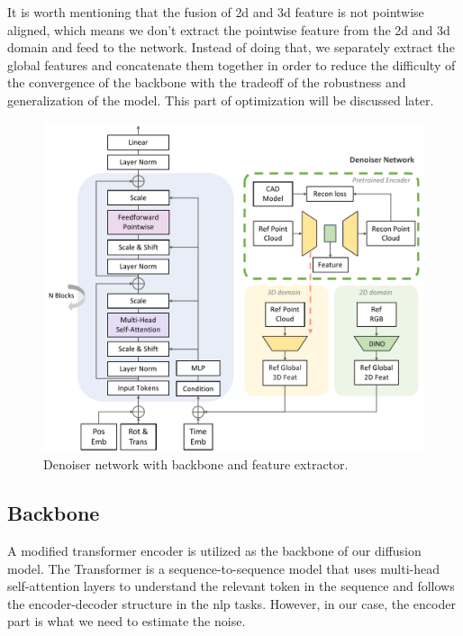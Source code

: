\documentclass[12pt,DIV14,BCOR12mm,a4paper,footinclude=false,headinclude,parskip=half-,twoside,openright,cleardoublepage=empty,toc=index,bibliography=totoc,listof=totoc]{scrreprt}
\numberwithin{equation}{chapter}
\begin{document}
It is worth mentioning that the fusion of \gls{2d} and \gls{3d} feature is not pointwise aligned, which means we don't extract the pointwise feature from the \gls{2d} and \gls{3d} domain and feed to the network. Instead of doing that, we separately extract the global features and concatenate them together in order to reduce the difficulty of the convergence of the backbone with the tradeoff of the robustness and generalization of the model. This part of optimization will be discussed later.
\begin{figure}[h]
	\centering
	\includegraphics[width=1.0\textwidth]{img/denoiser.pdf}
	\caption{Denoiser network with backbone and feature extractor.}
	\label{img:denoiser}
\end{figure}

\subsection{Backbone}
A modified transformer encoder is utilized as the backbone of our diffusion model. The Transformer \cite{vaswani2023attention} is a sequence-to-sequence model that uses multi-head self-attention layers to understand the relevant token in the sequence and follows the encoder-decoder structure in the \gls{nlp} tasks. However, in our case, the encoder part is what we need to estimate the noise.
\end{document}
